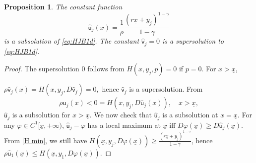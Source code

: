 \documentclass[11pt]{article}
\numberwithin{equation}{section}
\newtheorem{proposition}[theorem]{Proposition}
\theoremstyle{Claim}
\def\su{{\mathsf{u}}}
\def\sv{{\mathsf{v}}}
\newcommand{\ux}{{\underline x}}
\theoremstyle{plain}
\begin{document}

\begin{proposition}\label{comparison1d}
The constant function 
\begin{equation}\label{sub sol}
	\widehat{\su}_j(x) = \frac{1}{\rho} \frac{(r\ux + y_j)^{1 - \gamma}}{1 - \gamma}
\end{equation}
is a subsolution  of \eqref{eq:HJB1d}. The constant $\widehat{\sv}_j=0$ is a supersolution to \cref{eq:HJB1d}. 
\end{proposition}
\begin{proof}
The supersolution $0$ follows from $H(x,y_j,p)=0$ if $p=0$. For $x>\ux$,

$
\rho \widehat{\sv}_j(x)=H(x,y_j,D\widehat{\sv}_j)=0,
$
hence $\widehat{\sv}_j$ is a supersolution. From
$$
\rho \widehat{\su}_j(x)<0=H(x,y_j,D\widehat{\su}_j(x)),\quad x>\ux,
$$
$\widehat{\su}_j$ is a subsolution for $x>\ux$. We now check that $\widehat{\su}_j$ is a subsolution at $x=\ux$. For any $\varphi \in C^1[\ux,+\infty)$, $\widehat{\su}_j-\varphi$ has a local maximum at $\ux$ iff $D\varphi(\ux)\geq D\widehat{\su}_j(\ux)$. From \cref{H min},  we still have $H(\ux,y_j,D\varphi(\ux))\geq \frac{(r\ux + y_j )^{1 - \gamma}}{1 - \gamma}$, hence $\rho \widehat{\su}_1(\ux)\leq H(\ux,y_1,D\varphi(\ux))$. 
\end{proof}
\end{document}
